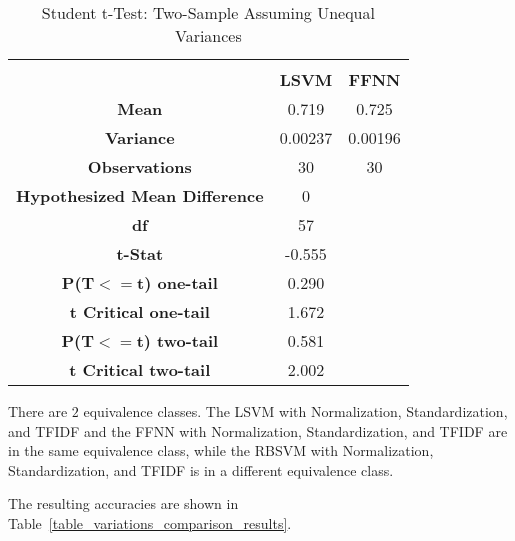 \documentclass[conference]{IEEEtran}
\begin{document}
\begin{table}[ht]
\caption{Student t-Test: Two-Sample Assuming Unequal Variances}
\def\arraystretch{1.1}
\begin{center}
\begin{tabular}{|c|cc|}
\hline
\textbf{}&\textbf{}&\textbf{} \\
\textbf{} & \textbf{LSVM} & \textbf{FFNN} \\
\hline
\textbf{Mean} & 0.719 & 0.725 \\
\hline
\textbf{Variance} & 0.00237 & 0.00196 \\
\hline
\textbf{Observations} & 30 & 30 \\
\hline
\textbf{Hypothesized Mean Difference} & 0 & \\
\hline
\textbf{df} & 57 &  \\
\hline
\textbf{t-Stat} & -0.555 & \\
\hline
\textbf{P(T\begin{math}{<=}\end{math}t) one-tail} & 0.290 & \\
\hline
\textbf{t Critical one-tail} & 1.672 & \\
\hline
\textbf{P(T\begin{math}{<=}\end{math}t) two-tail} & 0.581 & \\
\hline
\textbf{t Critical two-tail} & 2.002 & \\
\hline
\end{tabular}
\label{table:tTest_SS_SA}
\end{center}
\end{table}

%
There are \begin{math}2\end{math} equivalence classes. The LSVM with Normalization, Standardization, and TFIDF and the FFNN with Normalization, Standardization, and TFIDF are in the same equivalence class, while the RBSVM with Normalization, Standardization, and TFIDF is in a different equivalence class. 


The resulting accuracies are shown in Table~\ref{table_variations_comparison_results}. 
\end{document}
